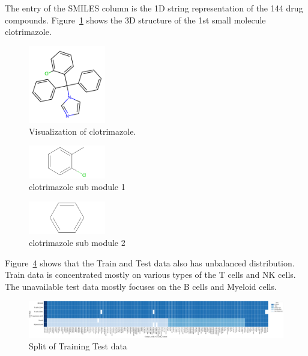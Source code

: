 \documentclass[11pt, oneside]{article}   	%
\begin{document}
The entry of the SMILES column is the 1D string representation of the 144 drug compounds. Figure~\ref{fig:smiles} shows the 3D structure of the 1st small molecule clotrimazole. 


\begin{figure}[htbp]
  \centering
  \includegraphics[width=0.3\textwidth]{smiles1.png}
  \caption{Visualization of clotrimazole.}
  \label{fig:smiles}
\end{figure}

\begin{figure}[htbp]
  \centering
  \includegraphics[width=0.3\textwidth]{smiles1-split1.png}
  \caption{clotrimazole sub module 1}
  \label{fig:smiles1}
\end{figure}

\begin{figure}[htbp]
  \centering
  \includegraphics[width=0.3\textwidth]{smiles1-split2.png}
  \caption{clotrimazole sub module 2}
  \label{fig:smiles2}
\end{figure}

Figure~\ref{fig:traintest} shows that the Train and Test data also has unbalanced distribution. Train data is concentrated mostly on various types of the T cells and NK cells. The unavailable test data mostly focuses on the B cells and Myeloid cells. 

\begin{figure}[htbp]
  \centering
  \includegraphics[width=1.0 \textwidth, height=0.3 \textwidth ]{train-test-split.png}
  \caption{Split of Training Test data}
  \label{fig:traintest}
\end{figure}
\end{document}
